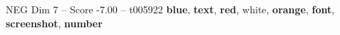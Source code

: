 \begin{textsample}{NEG Dim 7 – Score -7.00 – t005922}  \label{ex:f7_neg_023}
\textbf{blue}, \textbf{text}, \textbf{red}, white, \textbf{orange}, \textbf{font}, \textbf{screenshot}, \textbf{number}

\end{textsample}
